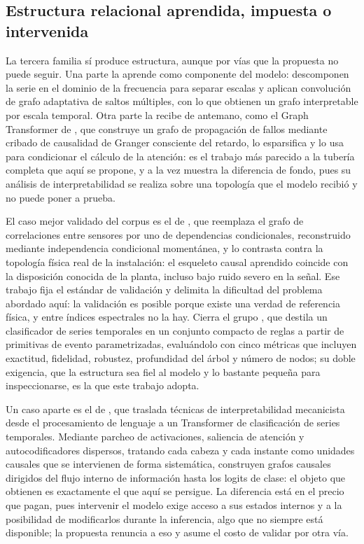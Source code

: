 \subsection{Estructura relacional aprendida, impuesta o intervenida}

La tercera familia sí produce estructura, aunque por vías que la propuesta no puede seguir. Una parte la aprende como componente del modelo: \textcite{cai2024msgnet} descomponen la serie en el dominio de la frecuencia para separar escalas y aplican convolución de grafo adaptativa de saltos múltiples, con lo que obtienen un grafo interpretable por escala temporal. Otra parte la recibe de antemano, como el Graph Transformer de \textcite{zhao2026causalguided}, que construye un grafo de propagación de fallos mediante cribado de causalidad de Granger consciente del retardo, lo esparsifica y lo usa para condicionar el cálculo de la atención: es el trabajo más parecido a la tubería completa que aquí se propone, y a la vez muestra la diferencia de fondo, pues su análisis de interpretabilidad se realiza sobre una topología que el modelo recibió y no puede poner a prueba.

El caso mejor validado del corpus es el de \textcite{pipeline2026causalgraph}, que reemplaza el grafo de correlaciones entre sensores por uno de dependencias condicionales, reconstruido mediante independencia condicional momentánea, y lo contrasta contra la topología física real de la instalación: el esqueleto causal aprendido coincide con la disposición conocida de la planta, incluso bajo ruido severo en la señal. Ese trabajo fija el estándar de validación y delimita la dificultad del problema abordado aquí: la validación es posible porque existe una verdad de referencia física, y entre índices espectrales no la hay. Cierra el grupo \textcite{rulexai2024events}, que destila un clasificador de series temporales en un conjunto compacto de reglas a partir de primitivas de evento parametrizadas, evaluándolo con cinco métricas que incluyen exactitud, fidelidad, robustez, profundidad del árbol y número de nodos; su doble exigencia, que la estructura sea fiel al modelo y lo bastante pequeña para inspeccionarse, es la que este trabajo adopta.

Un caso aparte es el de \textcite{mechinterp2025ts}, que traslada técnicas de interpretabilidad mecanicista desde el procesamiento de lenguaje a un Transformer de clasificación de series temporales. Mediante parcheo de activaciones, saliencia de atención y autocodificadores dispersos, tratando cada cabeza y cada instante como unidades causales que se intervienen de forma sistemática, construyen grafos causales dirigidos del flujo interno de información hasta los logits de clase: el objeto que obtienen es exactamente el que aquí se persigue. La diferencia está en el precio que pagan, pues intervenir el modelo exige acceso a sus estados internos y a la posibilidad de modificarlos durante la inferencia, algo que no siempre está disponible; la propuesta renuncia a eso y asume el costo de validar por otra vía.

